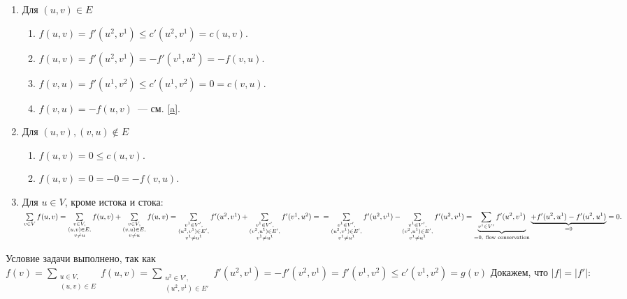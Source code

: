 \documentclass[a4paper]{article}
\begin{document}
\begin{enumerate}
\begin{enumerate}
\item Для $(u,v)\in E$
\begin{enumerate}
\item $f(u,v)=f'(u^2,v^1)\leqslant c'(u^2,v^1)=c(u,v)$.
\item \label{a} $f(u,v)=f'(u^2,v^1)=-f'(v^1,u^2)=-f(v,u)$.
\item $f(v,u)=f'(u^1,v^2)\leqslant c'(u^1,v^2)=0=c(v,u)$.
\item $f(v,u)=-f(u,v)$~--- см. \ref{a}.
\end{enumerate}
\item Для $(u,v), (v,u)\notin E$
\begin{enumerate}
\item $f(u,v)=0\leqslant c(u,v)$.
\item $f(u,v)=0=-0=-f(v,u)$.
\end{enumerate}
\item Для $u\in V$, кроме истока и стока:\newline
${\sum\limits_{v\in V}f(u,v)}={\sum\limits_{\substack{v\in V,\\ (u,v)\in E,\\v\neq u}}f(u,v)}+{\sum\limits_{\substack{v\in V,\\ (v,u)\in E,\\v\neq u}}f(u,v)}=
{\sum\limits_{\substack{v^1\in V',\\(u^2,v^1)\in E',\\v^1\neq u^1}}f'(u^2,v^1)}+{\sum\limits_{\substack{v^1\in V',\\(v^2,u^1)\in E',\\v^1\neq u^1}}f'(v^1,u^2)}=\newline
={\sum\limits_{\substack{v^1\in V',\\(u^2,v^1)\in E',\\v^1\neq u^1}}f'(u^2,v^1)}-{\sum\limits_{\substack{v^1\in V',\\(v^2,u^1)\in E',\\v^1\neq u^1}}f'(u^2,v^1)}=
\underbrace{\sum\limits_{v^1\in V'}f'(u^2,v^1)}_{=0,\ \text{flow\ conservation}}\underbrace{+f'(u^2,u^1)-f'(u^2,u^1)}_{=0}=0.$
\end{enumerate}
Условие задачи выполнено, так как\newline
$f(v)={\sum\limits_{\substack{u\in V,\\(u,v)\in E}}f(u,v)}={\sum\limits_{\substack{u^2\in V',\\(u^2,v^1)\in E'}}f'(u^2,v^1)}=-f'(v^2,v^1)=
f'(v^1,v^2)\leqslant c'(v^1,v^2)=g(v)$\newline
Докажем, что $|f|=|f'|$:\newline

\end{enumerate}
\end{document}

